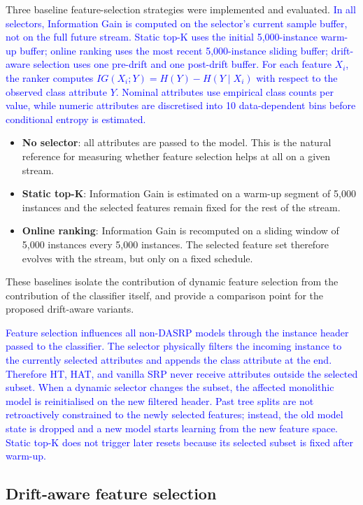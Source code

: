 \documentclass[12pt]{article}
\newcommand{\new}[1]{\textcolor{blue}{#1}}
\begin{document}
Three baseline feature-selection strategies were implemented and evaluated.
\new{In all selectors, Information Gain is computed on the selector's current
sample buffer, not on the full future stream. Static top-K uses the initial
5,000-instance warm-up buffer; online ranking uses the most recent
5,000-instance sliding buffer; drift-aware selection uses one pre-drift and one
post-drift buffer. For each feature $X_i$, the ranker computes
$IG(X_i;Y)=H(Y)-H(Y\mid X_i)$ with respect to the observed class attribute
$Y$. Nominal attributes use empirical class counts per value, while numeric
attributes are discretised into 10 data-dependent bins before conditional
entropy is estimated.}

\begin{itemize}
    \item \textbf{No selector}: all attributes are passed to the model. This
    is the natural reference for measuring whether feature selection helps at
    all on a given stream.
    \item \textbf{Static top-K}: Information Gain is estimated on a warm-up
    segment of 5,000 instances and the selected features remain fixed for the
    rest of the stream.
    \item \textbf{Online ranking}: Information Gain is recomputed on a sliding
    window of 5,000 instances every 5,000 instances. The selected feature set
    therefore evolves with the stream, but only on a fixed schedule.
\end{itemize}

These baselines isolate the contribution of dynamic feature selection from
the contribution of the classifier itself, and provide a comparison point for
the proposed drift-aware variants.

\new{Feature selection influences all non-DASRP models through the instance
header passed to the classifier. The selector physically filters the incoming
instance to the currently selected attributes and appends the class attribute at
the end. Therefore HT, HAT, and vanilla SRP never receive attributes outside
the selected subset. When a dynamic selector changes the subset, the affected
monolithic model is reinitialised on the new filtered header. Past tree splits
are not retroactively constrained to the newly selected features; instead, the
old model state is dropped and a new model starts learning from the new feature
space. Static top-K does not trigger later resets because its selected subset is
fixed after warm-up.}

\subsection{Drift-aware feature selection}
\label{subsec:drift-aware}
\end{document}
